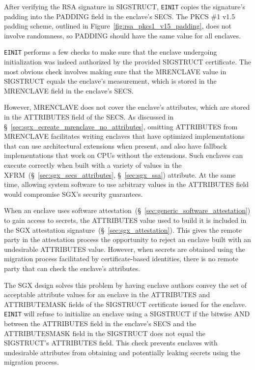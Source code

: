 After verifying the RSA signature in SIGSTRUCT, \texttt{EINIT} copies the
signature's padding into the PADDING field in the enclave's SECS. The PKCS \#1
v1.5 padding scheme, outlined in Figure~\ref{fig:rsa_pkcs1_v15_padding}, does
not involve randomness, so PADDING should have the same value for all enclaves.

\texttt{EINIT} performs a few checks to make sure that the enclave undergoing
initialization was indeed authorized by the provided SIGSTRUCT certificate. The
most obvious check involves making sure that the MRENCLAVE value in SIGSTRUCT
equals the enclave's measurement, which is stored in the MRENCLAVE field in
the enclave's SECS.


However, MRENCLAVE does not cover the enclave's attributes, which are stored in
the ATTRIBUTES field of the SECS. As discussed in
\S~\ref{sec:sgx_ecreate_mrenclave_no_attributes}, omitting ATTRIBUTES from
MRENCLAVE facilitates writing enclaves that have optimized implementations
that can use architectural extensions when present, and also have fallback
implementations that work on CPUs without the extensions. Such enclaves can
execute correctly when built with a variety of values in the
XFRM~(\S~\ref{sec:sgx_secs_attributes}, \S~\ref{sec:sgx_ssa}) attribute. At
the same time, allowing system software to use arbitrary values in the
ATTRIBUTES field would compromise SGX's security guarantees.

When an enclave uses software
attestation~(\S~\ref{sec:generic_software_attestation}) to gain access to
secrets, the ATTRIBUTES value used to build it is included in the SGX
attestation signature~(\S~\ref{sec:sgx_attestation}). This gives the remote
party in the attestation process the opportunity to reject an enclave built
with an undesirable ATTRIBUTES value. However, when secrets are obtained using
the migration process facilitated by certificate-based identities, there is no
remote party that can check the enclave's attributes.

The SGX design solves this problem by having enclave authors convey the set of
acceptable attribute values for an enclave in the ATTRIBUTES and ATTRIBUTEMASK
fields of the SIGSTRUCT certificate issued for the enclave. \texttt{EINIT} will
refuse to initialize an enclave using a SIGSTRUCT if the bitwise AND between
the ATTRIBUTES field in the enclave's SECS and the ATTRIBUTESMASK field in the
SIGSTRUCT does not equal the SIGSTRUCT's ATTRIBUTES field. This check prevents
enclaves with undesirable attributes from obtaining and potentially leaking
secrets using the migration process.

